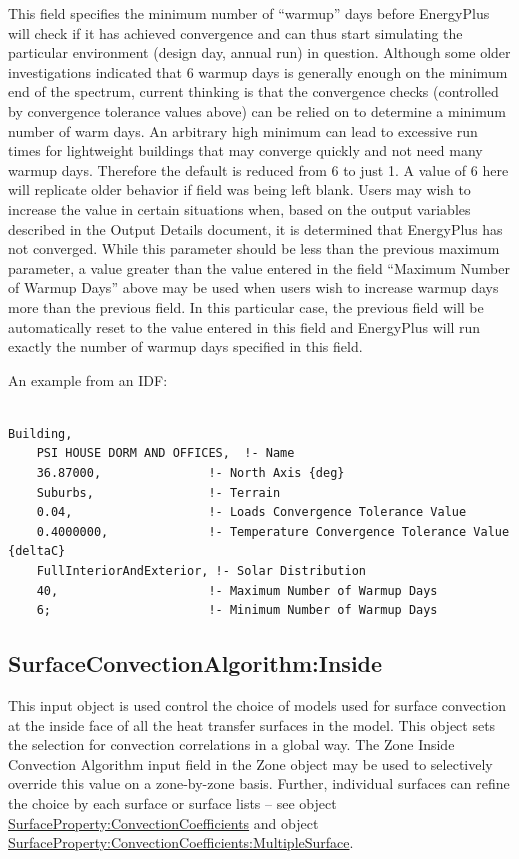 This field specifies the minimum number of ``warmup'' days before EnergyPlus will check if it has achieved convergence and can thus start simulating the particular environment (design day, annual run) in question. Although some older investigations indicated that 6 warmup days is generally enough on the minimum end of the spectrum, current thinking is that the convergence checks (controlled by convergence tolerance values above) can be relied on to determine a minimum number of warm days.  An arbitrary high minimum can lead to excessive run times for lightweight buildings that may converge quickly and not need many warmup days.  Therefore the default is reduced from 6 to just 1. A value of 6 here will replicate older behavior if field was being left blank.  Users may wish to increase the value in certain situations when, based on the output variables described in the Output Details document, it is determined that EnergyPlus has not converged. While this parameter should be less than the previous maximum parameter, a value greater than the value entered in the field ``Maximum Number of Warmup Days'' above may be used when users wish to increase warmup days more than the previous field. In this particular case, the previous field will be automatically reset to the value entered in this field and EnergyPlus will run exactly the number of warmup days specified in this field.

An example from an IDF:

\begin{lstlisting}

Building,
    PSI HOUSE DORM AND OFFICES,  !- Name
    36.87000,               !- North Axis {deg}
    Suburbs,                !- Terrain
    0.04,                   !- Loads Convergence Tolerance Value
    0.4000000,              !- Temperature Convergence Tolerance Value {deltaC}
    FullInteriorAndExterior, !- Solar Distribution
    40,                     !- Maximum Number of Warmup Days
    6;                      !- Minimum Number of Warmup Days
\end{lstlisting}

\subsection{SurfaceConvectionAlgorithm:Inside}\label{surfaceconvectionalgorithminside}

This input object is used control the choice of models used for surface convection at the inside face of all the heat transfer surfaces in the model. This object sets the selection for convection correlations in a global way. The Zone Inside Convection Algorithm input field in the Zone object may be used to selectively override this value on a zone-by-zone basis. Further, individual surfaces can refine the choice by each surface or surface lists -- see object \hyperref[surfacepropertyconvectioncoefficients]{SurfaceProperty:ConvectionCoefficients} and object \hyperref[surfacepropertyconvectioncoefficientsmultiplesurface]{SurfaceProperty:ConvectionCoefficients:MultipleSurface}.

